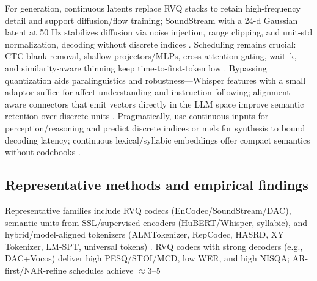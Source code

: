 \documentclass{article}
\begin{document}
For generation, continuous latents replace RVQ stacks to retain high-frequency detail and support diffusion/flow training; SoundStream with a 24-d Gaussian latent at 50 Hz stabilizes diffusion via noise injection, range clipping, and unit-std normalization, decoding without discrete indices \cite{yang2025diffsoundstreamefficientspeechtokenizati}. Scheduling remains crucial: CTC blank removal, shallow projectors/MLPs, cross-attention gating, wait--k, and similarity-aware thinning keep time-to-first-token low \cite{tsunoo2024decoderonlyarchitecturespeechrecognition,chen2024bestowefficientstreamablespeechlanguagem,xu2025optimaltransportregularizationspeechtext}. Bypassing quantization aids paralinguistics and robustness---Whisper features with a small adaptor suffice for affect understanding and instruction following; alignment-aware connectors that emit vectors directly in the LLM space improve semantic retention over discrete units \cite{wang2024blspemotowardsempatheticlargespeechlangu,tan2025ssralignmentawaremodalityconnectorspeech}. Pragmatically, use continuous inputs for perception/reasoning and predict discrete indices or mels for synthesis to bound decoding latency; continuous lexical/syllabic embeddings offer compact semantics without codebooks \cite{wang2024c3llmconditionalmultimodalcontentgenerat,yang2025diffsoundstreamefficientspeechtokenizati,tsunoo2024decoderonlyarchitecturespeechrecognition}.

\subsection{Representative methods and empirical findings} \label{subsec:Representative methods and empirical findings}
Representative families include RVQ codecs (EnCodec/SoundStream/DAC), semantic units from SSL/supervised encoders (HuBERT/Whisper, syllabic), and hybrid/model-aligned tokenizers (ALMTokenizer, RepCodec, HASRD, XY Tokenizer, LM-SPT, universal tokens) \cite{fily2024establishingdegreesclosenessbetweenaudio,zhang2025impactframeratesspeechtokenizercasestudy,maimon2025salmonsuiteacousticlanguagemodelevaluati}. RVQ codecs with strong decoders (e.g., DAC+Vocos) deliver high PESQ/STOI/MCD, low WER, and high NISQA; AR-first/NAR-refine schedules achieve $\approx$3--5%
\end{document}
